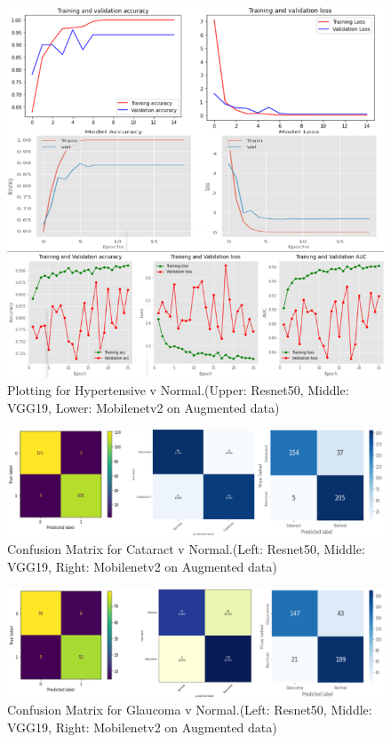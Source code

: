 \begin{figure}[H]
    \centering
    \includegraphics[scale=0.7]{c4.png}
    \caption{Plotting for Hypertensive v Normal.(Upper: Resnet50, Middle: VGG19, Lower: Mobilenetv2 on Augmented data)}
    \label{Plotting for Hypertensive v Normal}
\end{figure}
\begin{figure}[H]
    \centering
    \includegraphics[scale=0.7]{50_Chapter_5/CNC.png}
    \caption{Confusion Matrix for Cataract v Normal.(Left: Resnet50, Middle: VGG19, Right: Mobilenetv2 on Augmented data)}
    \label{CNC}
\end{figure}
\begin{figure}[H]
    \centering
    \includegraphics[scale=0.55]{50_Chapter_5/GNC.png}
    \caption{Confusion Matrix for Glaucoma v Normal.(Left: Resnet50, Middle: VGG19, Right: Mobilenetv2 on Augmented data)}
    \label{GNC}
\end{figure}
